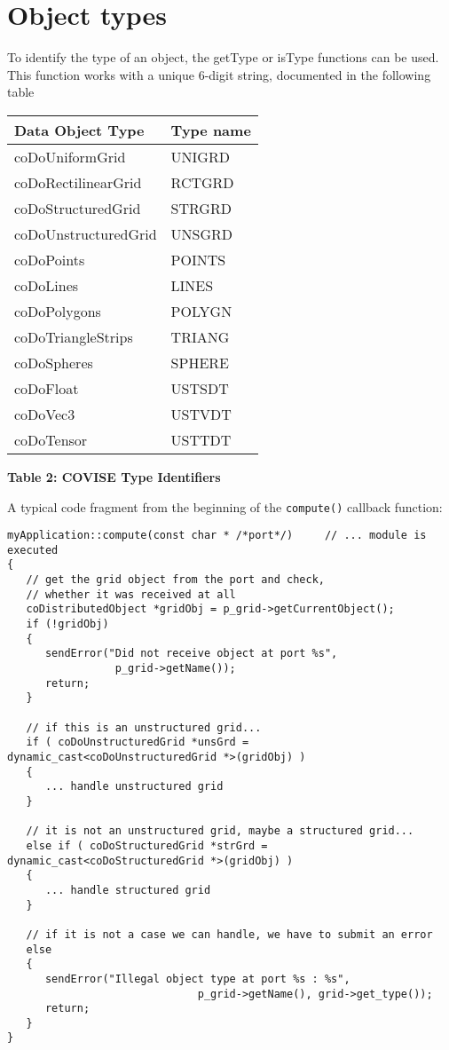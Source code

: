 \section{Object types}

To identify the type of an object, the getType or isType functions can be used. 
This function works with a unique 6-digit string, documented in the
following table

\begin{longtable}{|p{6cm}|p{6cm}|}
\hline
   {\bf Data Object Type} & {\bf Type name} \\
\hline\hline
	coDoUniformGrid & UNIGRD \\
\hline
	coDoRectilinearGrid & RCTGRD \\
\hline
	coDoStructuredGrid & STRGRD \\
\hline
	coDoUnstructuredGrid & UNSGRD \\
\hline
	coDoPoints & POINTS \\		
\hline
	coDoLines &  LINES \\
\hline
	coDoPolygons & POLYGN \\
\hline
	coDoTriangleStrips & TRIANG \\
\hline
	coDoSpheres & SPHERE \\		
\hline
	coDoFloat & USTSDT \\
\hline
	coDoVec3 & USTVDT \\
\hline
	coDoTensor & USTTDT \endhead	
\hline
\end{longtable}
{\bf        Table 2: COVISE Type Identifiers}
\vspace{1cm}

A typical code fragment from the beginning of the {\tt compute()} callback 
function:

\begin{verbatim}
myApplication::compute(const char * /*port*/)     // ... module is executed
{
   // get the grid object from the port and check, 
   // whether it was received at all
   coDistributedObject *gridObj = p_grid->getCurrentObject();
   if (!gridObj)
   {
      sendError("Did not receive object at port %s",
                 p_grid->getName());
      return;
   }
 
   // if this is an unstructured grid...
   if ( coDoUnstructuredGrid *unsGrd = dynamic_cast<coDoUnstructuredGrid *>(gridObj) )
   {
      ... handle unstructured grid
   }
 
   // it is not an unstructured grid, maybe a structured grid...
   else if ( coDoStructuredGrid *strGrd = dynamic_cast<coDoStructuredGrid *>(gridObj) )
   {
      ... handle structured grid
   }
 
   // if it is not a case we can handle, we have to submit an error
   else
   {
      sendError("Illegal object type at port %s : %s",
                              p_grid->getName(), grid->get_type());
      return;
   }
}
\end{verbatim}
 


